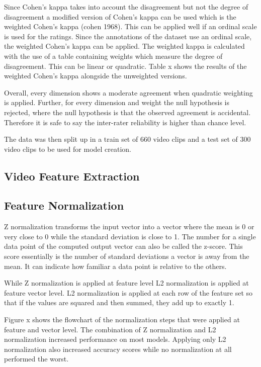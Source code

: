 Since Cohen's kappa takes into account the disagreement but not the degree of disagreement a modified version of Cohen's kappa can be used which is the weighted Cohen's kappa (cohen 1968). This can be applied well if an ordinal scale is used for the ratings. Since the annotations of the dataset use an ordinal scale, the weighted Cohen's kappa can be applied. The weighted kappa is calculated with the use of a table containing weights which measure the degree of disagreement. This can be linear or quadratic. Table x shows the results of the weighted Cohen's kappa alongside the unweighted versions. 

Overall, every dimension shows a moderate agreement when quadratic weighting is applied. Further, for every dimension and weight the null hypothesis is rejected, where the null hypothesis is that the observed agreement is accidental. Therefore it is safe to say the inter-rater reliability is higher than chance level. 

The data was then split up in a train set of 660 video clips and a test set of 300 video clips to be used for model creation. 

\subsection{Video Feature Extraction}

\subsection{Feature Normalization}
Z normalization transforms the input vector into a vector where the mean is 0 or very close to 0 while the standard deviation is close to 1. The number for a single data point of the computed output vector can also be called the z-score. This score essentially is the number of standard deviations a vector is away from the mean. It can indicate how familiar a data point is relative to the others. 

While Z normalization is applied at feature level L2 normalization is applied at feature vector level. L2 normalization is applied at each row of the feature set so that if the values are squared and then summed, they add up to exactly 1. 

Figure x shows the flowchart of the normalization steps that were applied at feature and vector level. The combination of Z normalization and L2 normalization increased performance on most models. Applying only L2 normalization also increased accuracy scores while no normalization at all performed the worst. 
